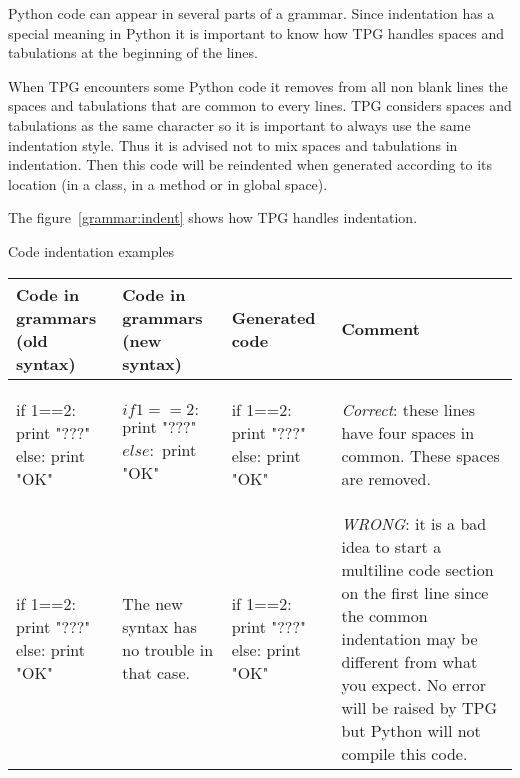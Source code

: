 Python code can appear in several parts of a grammar.
Since indentation has a special meaning in Python it is important to know how TPG handles spaces and tabulations at the beginning of the lines.

When TPG encounters some Python code it removes from all non blank lines the spaces and tabulations that are common to every lines.
TPG considers spaces and tabulations as the same character so it is important to always use the same indentation style.
Thus it is advised not to mix spaces and tabulations in indentation.
Then this code will be reindented when generated according to its location (in a class, in a method or in global space).

The figure~\ref{grammar:indent} shows how TPG handles indentation.

\begin{tableau}
\caption{Code indentation examples}                         \label{grammar:indent}
\begin{tabular}{| p{3.5cm} | p{3.5cm} | p{3cm} | p{3cm} |}
\hline
    Code in grammars (old syntax) & Code in grammars (new syntax) & Generated code & Comment \\
\hline
\hline

    \begin{verbatim*}
{{
    if 1==2:
        print "???"
    else:
        print "OK"
}}
    \end{verbatim*}
    &
    \begin{verbatim*}

$  if 1==2:
$      print "???"
$  else:
$      print "OK"

    \end{verbatim*}
    &
    \begin{verbatim*}

if 1==2:
    print "???"
else:
    print "OK"
    \end{verbatim*}
    &
    \emph{Correct}: these lines have four spaces in common.  These spaces are removed.
    \\

\hline

    \begin{verbatim*}
{{  if 1==2:
        print "???"
    else:
        print "OK"
}}
    \end{verbatim*}
    &
The new syntax has no trouble in that case.
    &
    \begin{verbatim*}
if 1==2:
      print "???"
  else:
      print "OK"
    \end{verbatim*}
    &
    \emph{WRONG}: it is a bad idea to start a multiline code section on the first line since the common indentation may be different from what you expect.  No error will be raised by TPG but Python will not compile this code.
    \\


\end{tabular}
\end{tableau}

